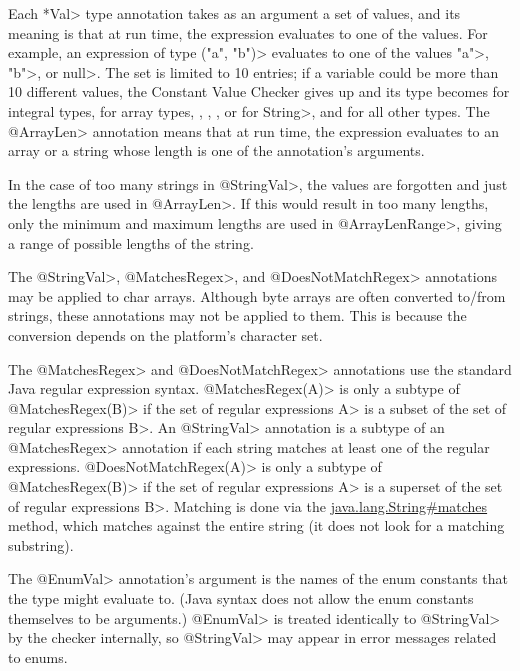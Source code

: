 Each \<*Val> type annotation takes as an argument a set of values, and its
meaning is that at run time, the expression evaluates to one of the values.  For
example, an expression of type
\<("a", "b")> evaluates to
one of the values \<"a">, \<"b">, or \<null>.
The set is limited to 10 entries; if a variable
could be more than 10 different values, the Constant Value
Checker gives up and its type becomes
 for integral types,
 for array types,
,
,
, or
 for \<String>, and
 for all other types.
The \<@ArrayLen> annotation means that at run time, the expression
evaluates to an array or a string whose length is one of the annotation's arguments.

In the case of too many strings in \<@StringVal>, the values are forgotten
and just the lengths are used in \<@ArrayLen>.
If this would result in too many lengths,
only the minimum and maximum lengths are used in \<@ArrayLenRange>,
giving a range of possible lengths of the string.

The \<@StringVal>, \<@MatchesRegex>, and \<@DoesNotMatchRegex>
annotations may be applied to char arrays.  Although byte
arrays are often converted to/from strings, these annotations may
not be applied to them.  This is because the conversion depends on the
platform's character set.

The \<@MatchesRegex> and \<@DoesNotMatchRegex> annotations use the standard Java regular expression syntax.
\<@MatchesRegex(A)> is only a subtype of \<@MatchesRegex(B)> if the set of regular
expressions \<A> is a subset of the set of regular expressions \<B>. An
\<@StringVal> annotation is a subtype of an \<@MatchesRegex> annotation if
each string matches at least one of the regular expressions.
\<@DoesNotMatchRegex(A)> is only a subtype of \<@MatchesRegex(B)> if the set of regular
expressions \<A> is a superset of the set of regular expressions \<B>.
Matching is done
via the
\href{https://docs.oracle.com/en/java/javase/25/docs/api/java.base/java/lang/String.html\#matches(java.lang.String)}{java.lang.String\#matches}
method, which matches against the entire string (it does not look for a
matching substring).

The \<@EnumVal> annotation's argument is the names of the enum constants
that the type might evaluate to.  (Java syntax does not allow the enum
constants themselves to be arguments.)  \<@EnumVal>
is treated identically to \<@StringVal> by the checker internally, so
\<@StringVal> may appear in error messages related to enums.

